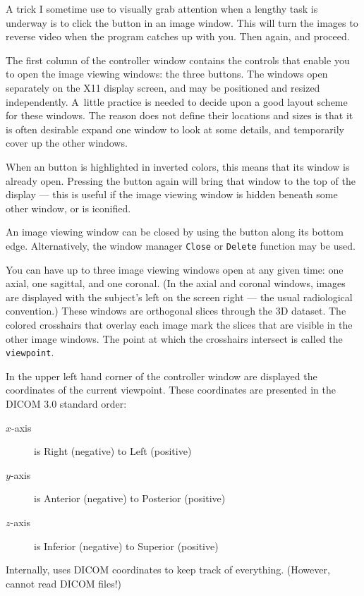 A trick I sometime use to visually grab attention when a lengthy task
is underway is to click the  button in an image window.
This will turn the images to reverse video when the program catches
up with you.  Then  again, and proceed.

The first column of the controller window contains the controls
that enable you to open the image viewing windows:  the three 
buttons.  The windows open separately on the X11 display screen, and
may be positioned and resized independently.  A~little practice is
needed to decide upon a good layout scheme for these windows.  The reason
\afnit does not define their locations and sizes is that it is often
desirable expand one window to look at some details, and temporarily
cover up the other windows.

When an  button is highlighted in inverted colors, this
means that its window is already open.  Pressing the button again
will bring that window to the top of the display --- this is useful
if the image viewing window is hidden beneath some other window, or
is iconified.

An image viewing window can be closed by using the 
button along its bottom edge.  Alternatively, the window manager
{\tt Close} or {\tt Delete} function may be used.

You can have up to three image viewing windows open at any given time:
one axial, one sagittal, and one coronal.  (In the axial and coronal windows,
images are displayed with the subject's left
on the screen right --- the
usual radiological convention.)  These windows are orthogonal slices
through the 3D dataset.  The colored crosshairs that overlay each image
mark the slices that are visible in the other image windows.  The point
at which the crosshairs intersect is called the {\tt viewpoint}.

In the upper left hand corner of the \afnit controller
window are displayed the coordinates of the current viewpoint.
These coordinates are presented in the DICOM 3.0 standard order:
\begin{description}
  \item[\blob $x$-axis] is Right (negative) to Left (positive)
  \item[\blob $y$-axis] is Anterior (negative) to Posterior (positive)
  \item[\blob $z$-axis] is Inferior (negative) to Superior (positive)
\end{description}
Internally, \afnit uses DICOM coordinates to keep track of everything.
(However, \afnit cannot read DICOM files!)


